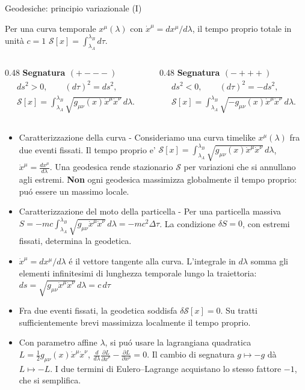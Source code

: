 \begin{frame}[t]{Geodesiche: principio variazionale (I)}
\small\raggedright
Per una curva temporale \(x^\mu(\lambda)\) con \(\dot x^\mu=dx^\mu/d\lambda\),
il tempo proprio totale in unità \(c=1\)
\(\mathcal S[x]=\int_{\lambda_A}^{\lambda_B}d\tau\).
\begin{columns}[T,onlytextwidth]
  \begin{column}{0.48\textwidth}
    \centering
    \textbf{Segnatura \((+---)\)}
    \[
    \begin{gathered}
    ds^2>0,\qquad (d\tau)^2=ds^2,\\[4pt]
    \mathcal S[x]=\int_{\lambda_A}^{\lambda_B}
      \sqrt{g_{\mu\nu}(x)\dot x^\mu\dot x^\nu}\,d\lambda.
    \end{gathered}
    \]
  \end{column}
  \begin{column}{0.48\textwidth}
    \centering
    \textbf{Segnatura \((-+++)\)}
    \[
    \begin{gathered}
    ds^2<0,\qquad (d\tau)^2=-ds^2,\\[4pt]
    \mathcal S[x]=\int_{\lambda_A}^{\lambda_B}
      \sqrt{-g_{\mu\nu}(x)\dot x^\mu\dot x^\nu}\,d\lambda.
    \end{gathered}
    \]
  \end{column}
\end{columns}
\begin{itemize}
    \item Caratterizzazione della curva - Consideriamo una curva timelike $x^\mu(\lambda)$ fra due eventi fissati. Il tempo proprio e' $\mathcal S[x]=\int_{\lambda_A}^{\lambda_B}\sqrt{g_{\mu\nu}(x)\dot x^\mu\dot x^\nu}\,d\lambda$, $\dot x^\mu=\frac{dx^\mu}{d\lambda}$. Una geodesica rende stazionario $\mathcal S$ per variazioni che si annullano agli estremi. \textbf{Non} ogni geodesica massimizza globalmente il tempo proprio: pu\'o essere un massimo locale.
    \item Caratterizzazione del moto della particella - Per una particella massiva $S=-mc\int_{\lambda_A}^{\lambda_B}\sqrt{g_{\mu\nu}\dot x^\mu\dot x^\nu}\,d\lambda=-mc^2\Delta\tau$. La condizione $\delta S=0$, con estremi fissati, determina la geodetica.
    \item $\dot x^\mu=dx^\mu/d\lambda$ \'e il vettore tangente alla curva. L'integrale in $d\lambda$ somma gli elementi infinitesimi di lunghezza temporale lungo la traiettoria: $ds=\sqrt{g_{\mu\nu}\dot x^\mu\dot x^\nu}\,d\lambda=c\,d\tau$
    \item Fra due eventi fissati, la geodetica soddisfa \(\delta\mathcal S[x]=0\). Su tratti sufficientemente brevi massimizza localmente il tempo proprio.
    \item Con parametro affine \(\lambda\), si pu\'o usare la lagrangiana quadratica $L=\tfrac{1}{2}g_{\mu\nu}(x)\dot x^\mu\dot x^\nu$, $\frac{d}{d\lambda}\frac{\partial L}{\partial\dot x^\rho}
-\frac{\partial L}{\partial x^\rho}=0$. Il cambio di segnatura \(g\mapsto-g\) dà \(L\mapsto-L\). I due termini di Eulero--Lagrange acquistano lo stesso fattore \(-1\), che si semplifica.
\end{itemize}
\end{frame}

